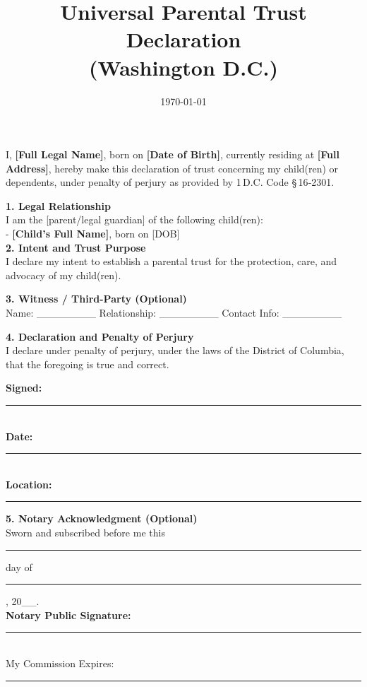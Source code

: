 \documentclass[12pt,letterpaper]{article}
\title{\textbf{Universal Parental Trust Declaration \\ (Washington D.C.)}}
\date{\today}
\author{}
\begin{document}
\maketitle
\onehalfspacing

\noindent
I, \textbf{[Full Legal Name]}, born on \textbf{[Date of Birth]}, currently residing at \textbf{[Full Address]}, hereby make this declaration of trust concerning my child(ren) or dependents, under penalty of perjury as provided by 1 D.C. Code § 16‑2301.

\vspace{1em}
\noindent
\textbf{1. Legal Relationship} \\
I am the [parent/legal guardian] of the following child(ren): \\
- \textbf{[Child's Full Name]}, born on [DOB] \\

\vspace{1em}
\noindent
\textbf{2. Intent and Trust Purpose} \\
I declare my intent to establish a parental trust for the protection, care, and advocacy of my child(ren).

\vspace{1em}
\noindent
\textbf{3. Witness / Third-Party (Optional)} \\
Name: \_\_\_\_\_\_\_\_ \quad Relationship: \_\_\_\_\_\_\_\_ \quad Contact Info: \_\_\_\_\_\_\_\_

\vspace{1em}
\noindent
\textbf{4. Declaration and Penalty of Perjury} \\
I declare under penalty of perjury, under the laws of the District of Columbia, that the foregoing is true and correct.

\vspace{2em}
\noindent
\textbf{Signed:} \rule{8cm}{0.4pt} \\
\textbf{Date:} \rule{5cm}{0.4pt} \\
\textbf{Location:} \rule{6cm}{0.4pt}

\vspace{1em}
\noindent
\textbf{5. Notary Acknowledgment (Optional)} \\
Sworn and subscribed before me this \rule{3cm}{0.4pt} day of \rule{5cm}{0.4pt}, 20\_\_. \\
\textbf{Notary Public Signature:} \rule{7cm}{0.4pt} \\
My Commission Expires: \rule{5cm}{0.4pt}
\end{document}
